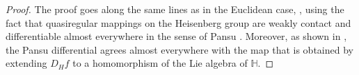 \documentclass[10pt,letterpaper]{amsart}
\theoremstyle{definition}
\numberwithin{thm}{subsection}
\numberwithin{equation}{section}
\begin{document}
\begin{proof}
The proof goes along the same lines as in the Euclidean case, \cite[Theorem 14.28]{MR1207810}, using the fact that quasiregular mappings on the Heisenberg group are weakly contact and differentiable almost everywhere in the sense of Pansu \cite{Pan89}. Moreover, as shown in \cite[\S 5]{MR1778673}, the Pansu differential agrees almost everywhere with the map that is obtained by extending $D_H f$ to a homomorphism of the Lie algebra of ${\mathbb H}$.
\end{proof}



\end{document}
